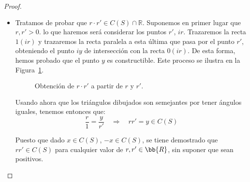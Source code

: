 \begin{prop}
\begin{proof}
\begin{itemize}
    \item Tratamos de probar que $r\cdot r'\in C(S)\cap \mathbb{R}$. Suponemos en primer lugar que $r,r'>0$.  lo que haremos será considerar los puntos $r'$, $ir$. Trazaremos la recta $1(ir)$ y trazaremos la recta paralela a esta última que pasa por el punto $r'$, obteniendo el punto $iy$ de intersección con la recta $0(ir)$. De esta forma, hemos probado que el punto $y$ es constructible. Este proceso se ilustra en la Figura~\ref{fig:producto_reales}.
        \begin{figure}[h]
            \centering
            \caption{Obtención de $r\cdot r'$ a partir de $r$ y $r'$.}
            \label{fig:producto_reales}
        \end{figure}
        \noindent
        Usando ahora que los triángulos dibujados son semejantes por tener ángulos iguales, tenemos entonces que:
        \begin{equation*}
            \dfrac{r}{1} = \dfrac{y}{r'} \quad \Longrightarrow \quad  rr'=y\in C(S)
        \end{equation*}

        Puesto que dado $x\in C(S)$, $-x\in C(S)$, se tiene demostrado que $rr'\in C(S)$ para cualquier valor de $r,r'\in \bb{R}$, sin suponer que sean positivos.


\end{itemize}
\end{proof}
\end{prop}
